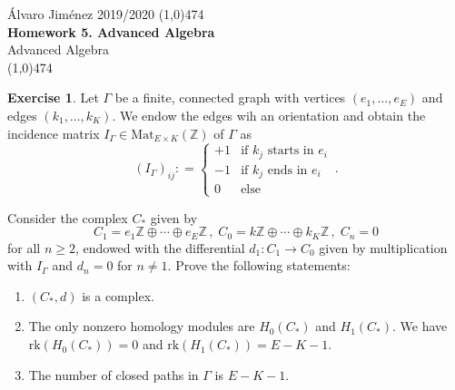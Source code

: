 \documentclass[a4paper,12pt]{article}
\theoremstyle{definition}
\newtheorem{exercise}{Exercise}
\begin{document}
\begin{center}
\footnotesize{Álvaro Jiménez \hfill 2019/2020}
\line(1,0){474}\\[0.2in]
\textbf{\Large Homework 5. Advanced Algebra}\\[0.1in]
\large Advanced Algebra\\
\line(1,0){474}\\

\end{center}

\begin{exercise}
Let $\Gamma$ be a finite, connected graph with vertices $(e_1, \dots , e_E)$ and edges $(k_1, \dots , k_K)$. We endow the edges wih an orientation and obtain the incidence matrix $I_{\Gamma} \in \text{Mat}_{E \times K}(\mathbb{Z})$ of $\Gamma$ as 
$$
 (I_{\Gamma})_{ij} : =\begin{cases}
+1 & \text{if $k_j$ starts in $e_i$}\\
-1 & \text{if $k_j$ ends in $e_i$}\\
0 & \text{else}
\end{cases} \, .$$

Consider the complex $C_*$ given by 
$$C_1  = e_1\mathbb{Z} \oplus \cdots \oplus e_E \mathbb{Z} \, , \; C_0 = k \mathbb{Z} \oplus \cdots \oplus k_K \mathbb{Z} \, , \; C_n = 0$$
for all $n \geq 2$, endowed with the differential $d_1  \colon C_1 \to C_0$ given by multiplication with $I_{\Gamma}$ and $d_n = 0$ for $n \neq 1$. Prove the following statements: 
\begin{enumerate}[label = \alph*)]
    \item $(C_*, d)$ is a complex. 
    \item The only nonzero homology modules are $H_0(C_*)$ and $H_1(C_*)$. We have $\text{rk}(H_0(C_*)) = 0$ and $\text{rk}(H_1(C_*)) = E - K -1$. 
    \item The number of closed paths in $\Gamma$ is $E-K-1$. 
\end{enumerate}
\end{exercise}
\end{document}
